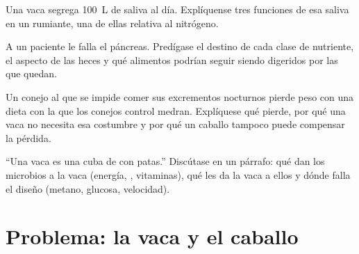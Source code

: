 \begin{exercise}[$\star\star$]\label{exo:b1:digestion-absorption:9}
Una vaca segrega \qty{100}{L} de saliva al día. Explíquense tres funciones
de esa saliva en un rumiante, una de ellas relativa al nitrógeno.
\end{exercise}

\begin{exercise}[$\star\star\star$]\label{exo:b1:digestion-absorption:10}
A un paciente le falla el páncreas. Predígase el destino de cada clase de
nutriente, el aspecto de las heces y qué alimentos podrían seguir siendo
digeridos por las  que quedan.
\end{exercise}

\begin{exercise}[$\star\star\star$]\label{exo:b1:digestion-absorption:11}
Un conejo al que se impide comer sus excrementos nocturnos pierde peso con
una dieta con la que los conejos control medran. Explíquese qué pierde, por
qué una vaca no necesita esa costumbre y por qué un caballo tampoco puede
compensar la pérdida.
\end{exercise}

\begin{exercise}[$\star\star\star$]\label{exo:b1:digestion-absorption:12}
``Una vaca es una cuba de  con patas.'' Discútase en un párrafo:
qué dan los microbios a la vaca (energía, , vitaminas), qué les da
la vaca a ellos y dónde falla el diseño (metano, glucosa, velocidad).
\end{exercise}

\section{Problema: la vaca y el caballo}

